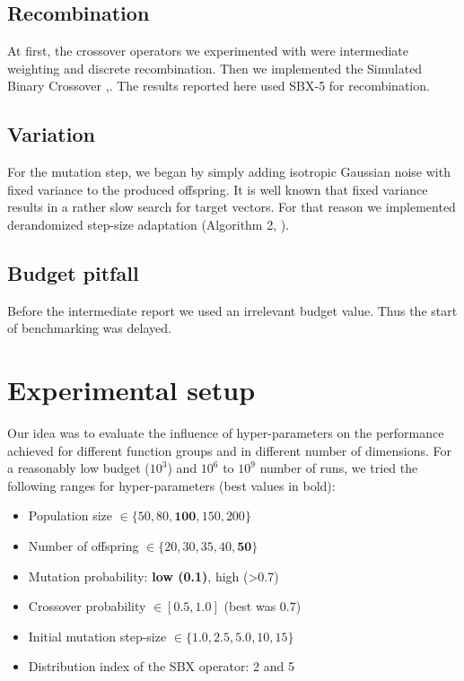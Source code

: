\documentclass{sig-alternate}
\begin{document}
\subsection{Recombination}

At first, the crossover operators we experimented with were intermediate weighting and discrete recombination. Then we implemented the Simulated Binary Crossover \cite{deb1994simulated},\cite{beyer2001self}. The results reported here used SBX-5 for recombination.

\subsection{Variation}

For the mutation step, we began by simply adding isotropic Gaussian noise with fixed variance to the produced offspring. 
It is well known that fixed variance results in a rather slow search for target vectors. 
For that reason we implemented derandomized step-size adaptation (Algorithm 2, \cite{hansen2015evolution}).


\subsection*{Budget pitfall} Before the intermediate report we used an irrelevant budget value. Thus the start of benchmarking was delayed.

\section{Experimental setup}
Our idea was to evaluate the influence of hyper-parameters on the performance achieved for different function groups and in different number of dimensions. For a reasonably low budget ($10^3$) and $10^6$ to $10^9$ number of runs, we tried the following ranges for hyper-parameters (best values in bold):
\begin{itemize}
\item Population size $\in \{50, 80, \bm{100}, 150, 200\}$
\item Number of offspring $\in \{20, 30, 35, 40, \bm{50}\}$
\item Mutation probability: \textbf{low (0.1)}, high (>0.7)
\item Crossover probability $\in {[0.5, 1.0]}$ (best was $\bm{0.7}$)
\item Initial mutation step-size $\in \{1.0, 2.5, \bm{5.0}, 10, 15\}$
\item Distribution index of the SBX operator: 2 and 5
\end{itemize}
\end{document}
